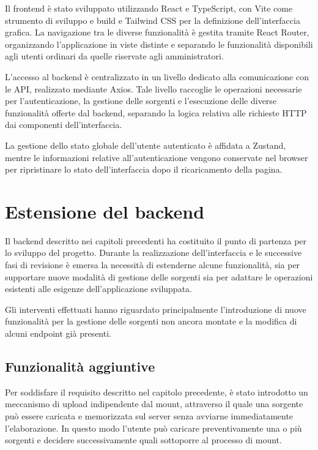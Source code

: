 \documentclass[13.6pt,a4paper]{report}
\begin{document}

\noindent
Il frontend è stato sviluppato utilizzando React e TypeScript, con Vite come strumento di sviluppo e build e Tailwind CSS per la definizione dell'interfaccia grafica. La navigazione tra le diverse funzionalità è gestita tramite React Router, organizzando l'applicazione in viste distinte e separando le funzionalità disponibili agli utenti ordinari da quelle riservate agli amministratori. 

\noindent
L'accesso al backend è centralizzato in un livello dedicato alla comunicazione con le API, realizzato mediante Axios. Tale livello raccoglie le operazioni necessarie per l'autenticazione, la gestione delle sorgenti e l'esecuzione delle diverse funzionalità offerte dal backend, separando la logica relativa alle richieste HTTP dai componenti dell'interfaccia.

\noindent
La gestione dello stato globale dell'utente autenticato è affidata a Zustand, mentre le informazioni relative all'autenticazione vengono conservate nel browser per ripristinare lo stato dell'interfaccia dopo il ricaricamento della pagina.


\chapter{Estensione del backend}

Il backend descritto nei capitoli precedenti ha costituito il punto di partenza per lo sviluppo del progetto. Durante la realizzazione dell'interfaccia e le successive fasi di revisione è emersa la necessità di estenderne alcune funzionalità, sia per supportare nuove modalità di gestione delle sorgenti sia per adattare le operazioni esistenti alle esigenze dell'applicazione sviluppata.

\noindent
Gli interventi effettuati hanno riguardato principalmente l'introduzione di nuove funzionalità per la gestione delle sorgenti non ancora montate e la modifica di alcuni endpoint già presenti. 


\section{Funzionalità aggiuntive}

Per soddisfare il requisito descritto nel capitolo precedente, è stato introdotto un meccanismo di upload indipendente dal mount, attraverso il quale una sorgente può essere caricata e memorizzata sul server senza avviarne immediatamente l'elaborazione. In questo modo l'utente può caricare preventivamente una o più sorgenti e decidere successivamente quali sottoporre al processo di mount.
\end{document}
